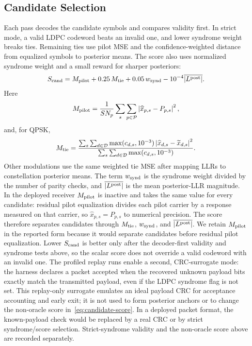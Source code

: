 \documentclass[journal]{IEEEtran}
\newcommand{\abs}[1]{\left\lvert #1 \right\rvert}
\begin{document}
\subsection{Candidate Selection}
\label{ssec:solver-selection}
Each pass decodes the candidate symbols and compares validity first. In strict
mode, a valid LDPC codeword beats an invalid one, and lower syndrome weight
breaks ties. Remaining ties use pilot MSE and the confidence-weighted distance
from equalized symbols to posterior means. The score also uses normalized
syndrome weight and a small reward for sharper posteriors:
\begin{equation}
  S_{\rm cand}
  =M_{\rm pilot}+0.25\,M_{\rm tie}
   +0.05\,w_{\rm synd}-10^{-4}\overline{|L^{\rm post}|}.
  \label{eq:candidate-score}
\end{equation}
Here
\begin{equation}
  M_{\rm pilot}
  =\frac{1}{SN_p}\sum_{s}\sum_{p\in\mathcal P}
    \abs{\widehat x_{p,s}-P_{p,s}}^2,
  \label{eq:candidate-pilot-mse}
\end{equation}
and, for QPSK,
\begin{equation}
  M_{\rm tie}
  =\frac{\sum_{s}\sum_{d\in\mathcal D}\max(c_{d,s},10^{-3})
          \abs{\widehat x_{d,s}-\widetilde x_{d,s}}^2}
         {\sum_{s}\sum_{d\in\mathcal D}\max(c_{d,s},10^{-3})}.
  \label{eq:candidate-tie-mse}
\end{equation}
Other modulations use the same weighted tie MSE after mapping LLRs to
constellation posterior means. The term $w_{\rm synd}$ is the syndrome weight
divided by the number of parity checks, and
$\overline{|L^{\rm post}|}$ is the mean posterior-LLR magnitude. In the
deployed receiver $M_{\rm pilot}$ is inactive and takes the same value for
every candidate: residual pilot equalization divides each pilot carrier by a
response measured on that carrier, so $\widehat x_{p,s}=P_{p,s}$ to numerical
precision. The score therefore separates candidates through $M_{\rm tie}$,
$w_{\rm synd}$, and $\overline{|L^{\rm post}|}$. We retain $M_{\rm pilot}$ in
the reported form because it would separate candidates before residual pilot
equalization. Lower
$S_{\rm cand}$ is better only after the decoder-first validity and syndrome
tests above, so the scalar score does not override a valid codeword with an
invalid one. The profiled replay runs enable a second, CRC-surrogate mode: the
harness declares a packet accepted when the recovered unknown payload bits
exactly match the transmitted payload, even if the LDPC syndrome flag is not set.
This replay-only surrogate emulates an ideal payload CRC for acceptance
accounting and early exit; it is not used to form posterior anchors or to change
the non-oracle score in~\eqref{eq:candidate-score}. In a deployed packet format,
the known-payload check would be replaced by a real CRC or by strict
syndrome/score selection. Strict-syndrome validity and the non-oracle score above
are recorded separately.
\end{document}
